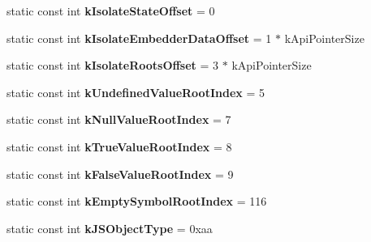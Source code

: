\begin{DoxyCompactItemize}
\item 
\hypertarget{classv8_1_1internal_1_1_internals_af591f991ecb24f9f6b33209e33b0d9ef}{}static const int {\bfseries k\+Isolate\+State\+Offset} = 0\label{classv8_1_1internal_1_1_internals_af591f991ecb24f9f6b33209e33b0d9ef}

\item 
\hypertarget{classv8_1_1internal_1_1_internals_ad722bf4760df09958cd1062db4a5524c}{}static const int {\bfseries k\+Isolate\+Embedder\+Data\+Offset} = 1 $\ast$ k\+Api\+Pointer\+Size\label{classv8_1_1internal_1_1_internals_ad722bf4760df09958cd1062db4a5524c}

\item 
\hypertarget{classv8_1_1internal_1_1_internals_a3142f942a25203ce7fca0e9a4563c74d}{}static const int {\bfseries k\+Isolate\+Roots\+Offset} = 3 $\ast$ k\+Api\+Pointer\+Size\label{classv8_1_1internal_1_1_internals_a3142f942a25203ce7fca0e9a4563c74d}

\item 
\hypertarget{classv8_1_1internal_1_1_internals_a7281ff0eafed559e64613465b1a03296}{}static const int {\bfseries k\+Undefined\+Value\+Root\+Index} = 5\label{classv8_1_1internal_1_1_internals_a7281ff0eafed559e64613465b1a03296}

\item 
\hypertarget{classv8_1_1internal_1_1_internals_ab311cf753ec5c968052bd83ef21e83f8}{}static const int {\bfseries k\+Null\+Value\+Root\+Index} = 7\label{classv8_1_1internal_1_1_internals_ab311cf753ec5c968052bd83ef21e83f8}

\item 
\hypertarget{classv8_1_1internal_1_1_internals_a93abd58b178eca469bade28e68b5c59e}{}static const int {\bfseries k\+True\+Value\+Root\+Index} = 8\label{classv8_1_1internal_1_1_internals_a93abd58b178eca469bade28e68b5c59e}

\item 
\hypertarget{classv8_1_1internal_1_1_internals_a90b6837aa368bbe4ffd914e6f753b167}{}static const int {\bfseries k\+False\+Value\+Root\+Index} = 9\label{classv8_1_1internal_1_1_internals_a90b6837aa368bbe4ffd914e6f753b167}

\item 
\hypertarget{classv8_1_1internal_1_1_internals_a424505ca99d031da8350e1fa45af8ed2}{}static const int {\bfseries k\+Empty\+Symbol\+Root\+Index} = 116\label{classv8_1_1internal_1_1_internals_a424505ca99d031da8350e1fa45af8ed2}

\item 
\hypertarget{classv8_1_1internal_1_1_internals_a56b7062df5d9a7df491137d4c3341bcc}{}static const int {\bfseries k\+J\+S\+Object\+Type} = 0xaa\label{classv8_1_1internal_1_1_internals_a56b7062df5d9a7df491137d4c3341bcc}


\end{DoxyCompactItemize}
